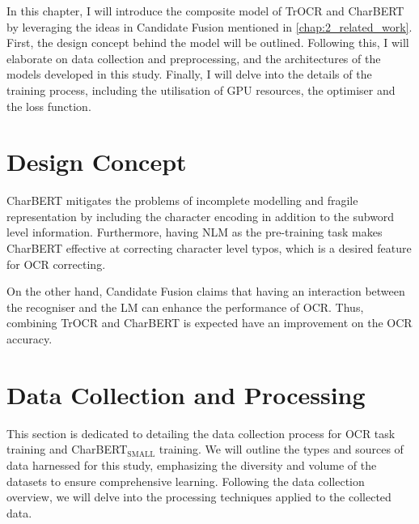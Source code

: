 \label{chap:3_method}
In this chapter, I will introduce the composite model of TrOCR and CharBERT by leveraging the ideas in Candidate Fusion mentioned in \autoref{chap:2_related_work}. First, the design concept behind the model will be outlined. Following this, I will elaborate on data collection and preprocessing, and the architectures of the models developed in this study. Finally, I will delve into the details of the training process, including the utilisation of GPU resources, the optimiser and the loss function.
\section{Design Concept}
\label{sec:3_design_concept}
CharBERT mitigates the problems of incomplete modelling and fragile representation by including the character encoding in addition to the subword level information. Furthermore, having NLM as the pre-training task makes CharBERT effective at correcting character level typos, which is a desired feature for OCR correcting. 

On the other hand, Candidate Fusion claims that having an interaction between the recogniser and the LM can enhance the performance of OCR. Thus, combining TrOCR and CharBERT is expected have an improvement on the OCR accuracy. 
\section{Data Collection and Processing}
\label{sec:3_data_collection_and_processing}
This section is dedicated to detailing the data collection process for OCR task training and CharBERT$_{\text{SMALL}}$ training. We will outline the types and sources of data harnessed for this study, emphasizing the diversity and volume of the datasets to ensure comprehensive learning. Following the data collection overview, we will delve into the processing techniques applied to the collected data.
